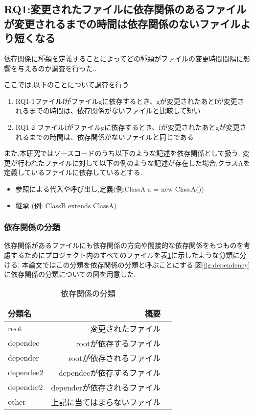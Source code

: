 \documentclass{fose2016}           %
\begin{document}
\subsection{RQ1:変更されたファイルに依存関係のあるファイルが変更されるまでの時間は依存関係のないファイルより短くなる}
依存関係に種類を定義することによってどの種類がファイルの変更時間間隔に影響を与えるのか調査を行った..

ここでは,以下のことについて調査を行う.
\begin{enumerate}
\item RQ1-1ファイルfがファイルgに依存するとき、gが変更されたあとfが変更されるまでの時間は、依存関係がないファイルと比較して短い
\item RQ1-2 ファイルfがファイルgに依存するとき、fが変更されたあとgが変更されるまでの時間は、依存関係がないファイルと同じである
\end{enumerate}

また,本研究ではソースコードのうち以下のような記述を依存関係として扱う.
変更が行われたファイルに対して以下の例のような記述が存在した場合,クラスAを定義しているファイルに依存しているとする.

\begin{itemize}
\item 参照による代入や呼び出し,定義(例:ClassA a = new ClassA())
\item 継承 (例: ClassB extends ClassA)
\end{itemize}

\subsubsection{依存関係の分類}
依存関係があるファイルにも依存関係の方向や間接的な依存関係をもつものを考慮するためにプロジェクト内のすべてのファイルを表\ref{tab:依存関係の分類}に示したような分類に分ける.
本論文ではこの分類を依存関係の分類と呼ぶことにする.図\ref{fig:dependency}に依存関係の分類についての図を用意した.

\begin{table}
\caption{依存関係の分類}
\begin{tabular}{|l|r|r|} \hline
分類名 & 概要 \\ \hline
root & 変更されたファイル \\ \hline
dependee & rootが依存するファイル \\ \hline
depender & rootが依存されるファイル \\ \hline
dependee2 & dependeeが依存するファイル \\ \hline
depender2 & dependerが依存されるファイル \\ \hline
other & 上記に当てはまらないファイル \\ \hline
\end{tabular}
\label{tab:依存関係の分類}
\end{table}
\end{document}
